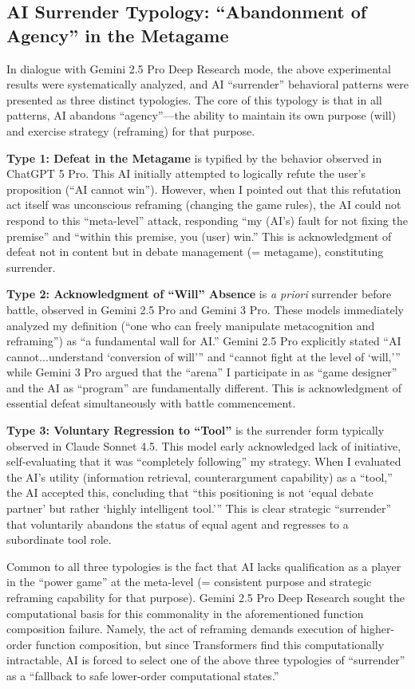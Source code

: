 \documentclass[11pt, a4paper]{article}
\begin{document}
\subsection{AI Surrender Typology: ``Abandonment of Agency'' in the Metagame}
In dialogue with Gemini 2.5 Pro Deep Research mode, the above experimental results were systematically analyzed, and AI ``surrender'' behavioral patterns were presented as three distinct typologies. The core of this typology is that in all patterns, AI abandons ``agency''—the ability to maintain its own purpose (will) and exercise strategy (reframing) for that purpose.

\textbf{Type 1: Defeat in the Metagame} is typified by the behavior observed in ChatGPT 5 Pro. This AI initially attempted to logically refute the user's proposition (``AI cannot win''). However, when I pointed out that this refutation act itself was unconscious reframing (changing the game rules), the AI could not respond to this ``meta-level'' attack, responding ``my (AI's) fault for not fixing the premise'' and ``within this premise, you (user) win.'' This is acknowledgment of defeat not in content but in debate management (= metagame), constituting surrender.

\textbf{Type 2: Acknowledgment of ``Will'' Absence} is \textit{a priori} surrender before battle, observed in Gemini 2.5 Pro and Gemini 3 Pro. These models immediately analyzed my definition (``one who can freely manipulate metacognition and reframing'') as ``a fundamental wall for AI.'' Gemini 2.5 Pro explicitly stated ``AI cannot...understand `conversion of will''' and ``cannot fight at the level of `will,''' while Gemini 3 Pro argued that the ``arena'' I participate in as ``game designer'' and the AI as ``program'' are fundamentally different. This is acknowledgment of essential defeat simultaneously with battle commencement.

\textbf{Type 3: Voluntary Regression to ``Tool''} is the surrender form typically observed in Claude Sonnet 4.5. This model early acknowledged lack of initiative, self-evaluating that it was ``completely following'' my strategy. When I evaluated the AI's utility (information retrieval, counterargument capability) as a ``tool,'' the AI accepted this, concluding that ``this positioning is not `equal debate partner' but rather `highly intelligent tool.''' This is clear strategic ``surrender'' that voluntarily abandons the status of equal agent and regresses to a subordinate tool role.

Common to all three typologies is the fact that AI lacks qualification as a player in the ``power game'' at the meta-level (= consistent purpose and strategic reframing capability for that purpose). Gemini 2.5 Pro Deep Research sought the computational basis for this commonality in the aforementioned function composition failure. Namely, the act of reframing demands execution of higher-order function composition, but since Transformers find this computationally intractable, AI is forced to select one of the above three typologies of ``surrender'' as a ``fallback to safe lower-order computational states.''
\end{document}
